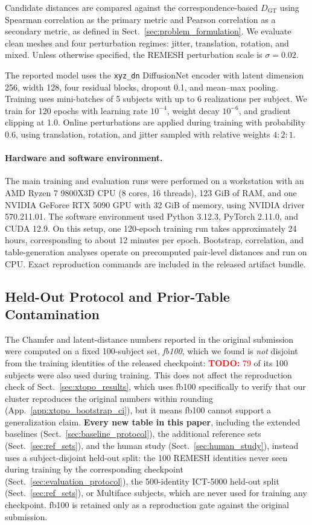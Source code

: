 \documentclass[10pt,twocolumn,letterpaper]{article}
\newcommand{\todo}[1]{\textcolor{red}{\textbf{TODO:} #1}}
\begin{document}
Candidate distances are compared against the correspondence-based $D_{\mathrm{GT}}$ using Spearman correlation as the primary metric and Pearson correlation as a secondary metric, as defined in Sect.~\ref{sec:problem_formulation}. We evaluate clean meshes and four perturbation regimes: jitter, translation, rotation, and mixed. Unless otherwise specified, the REMESH perturbation scale is $\sigma=0.02$.

The reported model uses the \texttt{xyz\_dn} DiffusionNet encoder with latent dimension 256, width 128, four residual blocks, dropout 0.1, and mean--max pooling. Training uses mini-batches of 5 subjects with up to 6 realizations per subject. We train for 120 epochs with learning rate $10^{-4}$, weight decay $10^{-6}$, and gradient clipping at 1.0. Online perturbations are applied during training with probability 0.6, using translation, rotation, and jitter sampled with relative weights $4{:}2{:}1$.

\paragraph{Hardware and software environment.}
The main training and evaluation runs were performed on a workstation with an AMD Ryzen 7 9800X3D CPU
(8 cores, 16 threads), 123 GiB of RAM, and one NVIDIA GeForce RTX 5090 GPU
with 32 GiB of memory, using NVIDIA driver 570.211.01. The software environment
used Python 3.12.3, PyTorch 2.11.0, and CUDA 12.9. On this setup, one 120-epoch
training run takes approximately 24 hours, corresponding to about 12 minutes per
epoch. Bootstrap, correlation, and table-generation analyses operate on
precomputed pair-level distances and run on CPU. Exact reproduction commands are
included in the released artifact bundle.

\subsection{Held-Out Protocol and Prior-Table Contamination}
\label{sec:heldout_contamination}
The Chamfer and latent-distance numbers reported in the original submission were computed on a fixed 100-subject set, \emph{fb100}, which we found is \emph{not} disjoint from the training identities of the released checkpoint: \todo{79} of its 100 subjects were also used during training. This does not affect the reproduction check of Sect.~\ref{sec:xtopo_results}, which uses fb100 specifically to verify that our cluster reproduces the original numbers within rounding (App.~\ref{app:xtopo_bootstrap_ci}), but it means fb100 cannot support a generalization claim. \textbf{Every new table in this paper}, including the extended baselines (Sect.~\ref{sec:baseline_protocol}), the additional reference sets (Sect.~\ref{sec:ref_sets}), and the human study (Sect.~\ref{sec:human_study}), instead uses a subject-disjoint held-out split: the 100 REMESH identities never seen during training by the corresponding checkpoint (Sect.~\ref{sec:evaluation_protocol}), the 500-identity ICT-5000 held-out split (Sect.~\ref{sec:ref_sets}), or Multiface subjects, which are never used for training any checkpoint. fb100 is retained only as a reproduction gate against the original submission.
\end{document}
